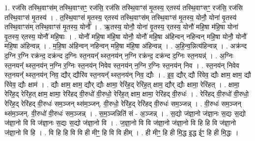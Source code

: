 \documentclass[17pt]{extarticle}
\begin{document}
1. रज॑सि तस्थि॒वाꣳस॑म् तस्थि॒वाꣳसꣳ॒॒ रज॑सि॒ रज॑सि तस्थि॒वाꣳस॑ मृ॒तस्य॒ र्‌तस्य॑ तस्थि॒वाꣳसꣳ॒॒ रज॑सि॒ रज॑सि तस्थि॒वाꣳस॑ मृ॒तस्य॑ । . त॒स्थि॒वाꣳस॑ मृ॒तस्य॒ र्‌तस्य॑ तस्थि॒वाꣳस॑म् तस्थि॒वाꣳस॑ मृ॒तस्य॒ योनौ॒ योना॑ वृ॒तस्य॑ तस्थि॒वाꣳस॑म् तस्थि॒वाꣳस॑ मृ॒तस्य॒ योनौ᳚ । . ऋ॒तस्य॒ योनौ॒ योना॑ वृ॒तस्य॒ र्‌तस्य॒ योनौ॑ महि॒षा म॑हि॒षा योना॑ वृ॒तस्य॒ र्‌तस्य॒ योनौ॑ महि॒षाः । . योनौ॑ महि॒षा म॑हि॒षा योनौ॒ योनौ॑ महि॒षा अ॑हिन्वन् नहिन्वन् महि॒षा योनौ॒ योनौ॑ महि॒षा अ॑हिन्वन्न् । . म॒हि॒षा अ॑हिन्वन् नहिन्वन् महि॒षा म॑हि॒षा अ॑हिन्वन्न् । . अ॒हि॒न्व॒न्नित्य॑हिन्वन्न् । . अक्र॑न्द द॒ग्नि र॒ग्नि रक्र॑न्द॒ दक्र॑न्द द॒ग्निः स्त॒नयन्᳚ थ्स्त॒नय॑न् न॒ग्नि रक्र॑न्द॒ दक्र॑न्द द॒ग्निः स्त॒नयन्न्॑ । . अ॒ग्निः स्त॒नयन्᳚ थ्स्त॒नय॑न् न॒ग्नि र॒ग्निः स्त॒नय॑न् निवेव स्त॒नय॑न् न॒ग्नि र॒ग्निः स्त॒नय॑न् निव । . स्त॒नय॑न् निवेव स्त॒नयन्᳚ थ्स्त॒नय॑न् निव॒ द्यौर् द्यौरि॑व स्त॒नयन्᳚ थ्स्त॒नय॑न् निव॒ द्यौः । . इ॒व॒ द्यौर् द्यौ रि॑वेव॒ द्यौः क्षाम॒ क्षाम॒ द्यौ रि॑वेव॒ द्यौः क्षाम॑ । . द्यौः क्षाम॒ क्षाम॒ द्यौर् द्यौः क्षामा॒ रेरि॑ह॒द् रेरि॑ह॒त् क्षाम॒ द्यौर् द्यौः क्षामा॒ रेरि॑हत् । . क्षामा॒ रेरि॑ह॒द् रेरि॑ह॒त् क्षाम॒ क्षामा॒ रेरि॑हद् वी॒रुधो॑ वी॒रुधो॒ रेरि॑ह॒त् क्षाम॒ क्षामा॒ रेरि॑हद् वी॒रुधः॑ । . रेरि॑हद् वी॒रुधो॑ वी॒रुधो॒ रेरि॑ह॒द् रेरि॑हद् वी॒रुधः॑ सम॒ञ्जन् थ्स॑म॒ञ्जन्. वी॒रुधो॒ रेरि॑ह॒द् रेरि॑हद् वी॒रुधः॑ सम॒ञ्जन्न् । . वी॒रुधः॑ सम॒ञ्जन् थ्स॑म॒ञ्जन्. वी॒रुधो॑ वी॒रुधः॑ सम॒ञ्जन्न् । . स॒म॒ञ्जन्निति॑ सं - अ॒ञ्जन्न् । . स॒द्यो ज॑ज्ञा॒नो ज॑ज्ञा॒नः स॒द्यः स॒द्यो ज॑ज्ञा॒नो वि वि ज॑ज्ञा॒नः स॒द्यः स॒द्यो ज॑ज्ञा॒नो वि । . ज॒ज्ञा॒नो वि वि ज॑ज्ञा॒नो ज॑ज्ञा॒नो वि हि हि वि ज॑ज्ञा॒नो ज॑ज्ञा॒नो वि हि । . वि हि हि वि वि ही मीꣳ॒॒ हि वि वि हीम् । . ही मीꣳ॒॒ हि ही मि॒द्ध इ॒द्ध ईꣳ॒॒ हि ही मि॒द्धः । \newline
\end{document}
